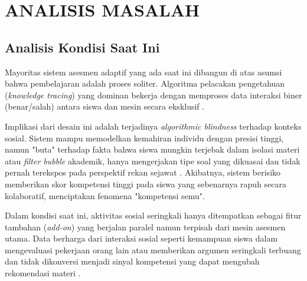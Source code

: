 
\chapter{ANALISIS MASALAH}
\label{chap:analisis-masalah}
\section{Analisis Kondisi Saat Ini}
\label{sec:kondisi_saat_ini}


Mayoritas sistem asesmen adaptif yang ada saat ini dibangun di atas asumsi bahwa pembelajaran adalah proses soliter. Algoritma pelacakan pengetahuan (\textit{knowledge tracing}) yang dominan bekerja dengan memproses data interaksi biner (benar/salah) antara siswa dan mesin secara eksklusif \autocite{Minn2022}. 

Implikasi dari desain ini adalah terjadinya \textit{algorithmic blindness} terhadap konteks sosial. Sistem mampu memodelkan kemahiran individu dengan presisi tinggi, namun "buta" terhadap fakta bahwa siswa mungkin terjebak dalam isolasi materi atau \textit{filter bubble} akademik, hanya mengerjakan tipe soal yang dikuasai dan tidak pernah terekspos pada perspektif rekan sejawat \autocite{Halkiopoulos2024}. Akibatnya, sistem berisiko memberikan skor kompetensi tinggi pada siswa yang sebenarnya rapuh secara kolaboratif, menciptakan fenomena "kompetensi semu".

Dalam kondisi saat ini, aktivitas sosial seringkali hanya ditempatkan sebagai fitur tambahan (\textit{add-on}) yang berjalan paralel namun terpisah dari mesin asesmen utama. Data berharga dari interaksi sosial seperti kemampuan siswa dalam mengevaluasi pekerjaan orang lain atau memberikan argumen seringkali terbuang dan tidak dikonversi menjadi sinyal kompetensi yang dapat mengubah rekomendasi materi \autocite{Ihichr2024}.

